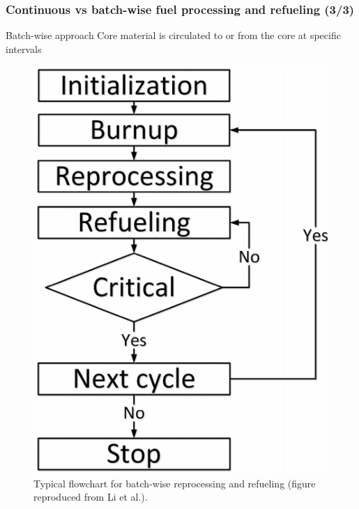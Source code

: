 \begin{frame}
\frametitle{Continuous vs batch-wise fuel processing and refueling (3/3)}
	\begin{block}{Batch-wise approach}
		Core material is circulated to or from the core at specific intervals		
	\end{block}
           \begin{figure}[t]
           		\hspace{3mm}
	\includegraphics[height=0.4\textwidth]{./images/batch-wise.png}
	\caption{Typical flowchart for batch-wise reprocessing and refueling (figure reproduced from Li et al.\cite{li_optimization_2018}).}
			\end{figure}               
\end{frame}


